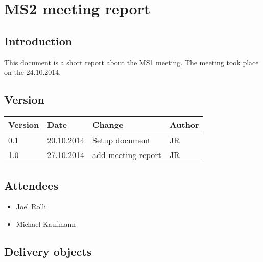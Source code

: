 
\chapter{MS2 meeting report} %

\label{ChapterX} %



\section{Introduction}

This document is a short report about the MS1 meeting. The meeting took place on the 24.10.2014.

\section{Version}


\begin{tabular}{| p{1.5cm} | p{2cm} | p{9cm} | p{1.5cm} |}
    \hline
    Version 	& Date      		& Change & Author 								\\ \hline
    0.1    		& 20.10.2014        & Setup document        				& JR 	\\ \hline
    1.0 		& 27.10.2014 		& add meeting report 					& JR 	\\ \hline
\end{tabular}


\section{Attendees}
\begin{itemize}
\item Joel Rolli
\item Michael Kaufmann
\end{itemize}

\section{Delivery objects}

